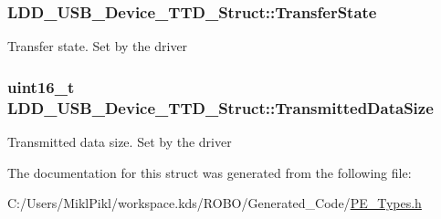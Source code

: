 \subsubsection[{Transfer\+State}]{ L\+D\+D\+\_\+\+U\+S\+B\+\_\+\+Device\+\_\+\+T\+T\+D\+\_\+\+Struct\+::\+Transfer\+State}\label{struct_l_d_d___u_s_b___device___t_t_d___struct_aca23e3743f56dc73206b79f885e9130f}
Transfer state. Set by the driver \hypertarget{struct_l_d_d___u_s_b___device___t_t_d___struct_aeffbf1300fce5fc9ebf98f5760a96d38}{}
\subsubsection[{Transmitted\+Data\+Size}]{\setlength{\rightskip}{0pt plus 5cm}uint16\+\_\+t L\+D\+D\+\_\+\+U\+S\+B\+\_\+\+Device\+\_\+\+T\+T\+D\+\_\+\+Struct\+::\+Transmitted\+Data\+Size}\label{struct_l_d_d___u_s_b___device___t_t_d___struct_aeffbf1300fce5fc9ebf98f5760a96d38}
Transmitted data size. Set by the driver 

The documentation for this struct was generated from the following file\+:\begin{DoxyCompactItemize}
\item 
C\+:/\+Users/\+Mikl\+Pikl/workspace.\+kds/\+R\+O\+B\+O/\+Generated\+\_\+\+Code/\hyperlink{_p_e___types_8h}{P\+E\+\_\+\+Types.\+h}\end{DoxyCompactItemize}
